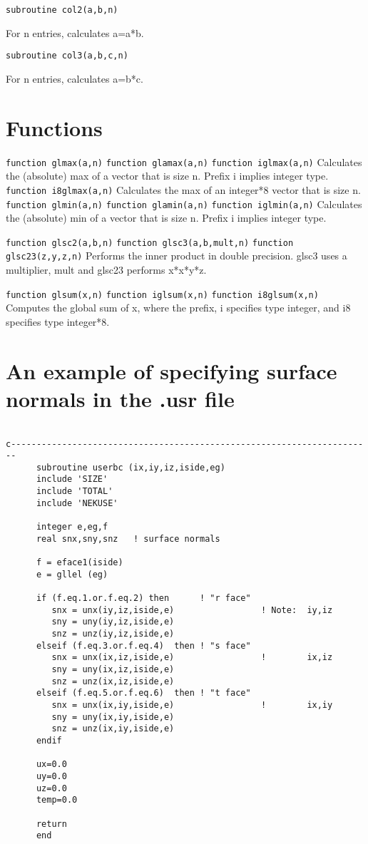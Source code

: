 {\tt subroutine col2(a,b,n)}

    For n entries, calculates a=a*b. 
    
{\tt subroutine col3(a,b,c,n)}

    For n entries, calculates a=b*c. 
\section{Functions}

{\tt function glmax(a,n)}
{\tt function glamax(a,n)}
{\tt function iglmax(a,n)}
    Calculates the (absolute) max of a vector that is size n. Prefix i implies integer type. 
{\tt function i8glmax(a,n)}
    Calculates the max of an integer*8 vector that is size n. 
{\tt function glmin(a,n)}
{\tt function glamin(a,n)}
{\tt function iglmin(a,n)}
    Calculates the (absolute) min of a vector that is size n. Prefix i implies integer type. 


{\tt function glsc2(a,b,n)}
{\tt function glsc3(a,b,mult,n)}
{\tt function glsc23(z,y,z,n)}
    Performs the inner product in double precision. glsc3 uses a multiplier, mult and glsc23 performs x*x*y*z. 


{\tt function glsum(x,n)}
{\tt function iglsum(x,n)}
{\tt function i8glsum(x,n)}
    Computes the global sum of x, where the prefix, i specifies type integer, and i8 specifies type integer*8. 

\section{An example of specifying surface normals in the .usr file}
\begin{verbatim}

c-----------------------------------------------------------------------
      subroutine userbc (ix,iy,iz,iside,eg)
      include 'SIZE'
      include 'TOTAL'
      include 'NEKUSE'

      integer e,eg,f
      real snx,sny,snz   ! surface normals

      f = eface1(iside)
      e = gllel (eg)

      if (f.eq.1.or.f.eq.2) then      ! "r face"
         snx = unx(iy,iz,iside,e)                 ! Note:  iy,iz
         sny = uny(iy,iz,iside,e)
         snz = unz(iy,iz,iside,e)
      elseif (f.eq.3.or.f.eq.4)  then ! "s face"
         snx = unx(ix,iz,iside,e)                 !        ix,iz
         sny = uny(ix,iz,iside,e)
         snz = unz(ix,iz,iside,e)
      elseif (f.eq.5.or.f.eq.6)  then ! "t face"
         snx = unx(ix,iy,iside,e)                 !        ix,iy
         sny = uny(ix,iy,iside,e)
         snz = unz(ix,iy,iside,e)
      endif

      ux=0.0
      uy=0.0
      uz=0.0
      temp=0.0

      return
      end
\end{verbatim}  

